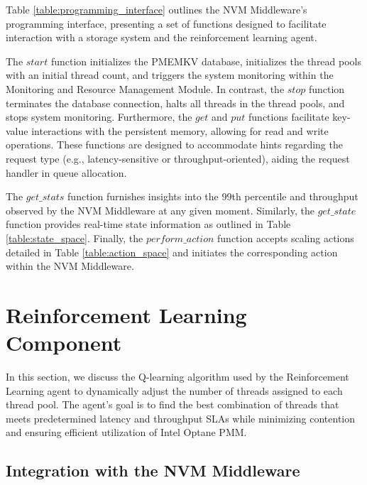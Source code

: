 Table \ref{table:programming_interface} outlines the NVM Middleware's programming interface, presenting a set of functions designed to facilitate interaction with a storage system and the reinforcement learning agent. 

The $start$ function initializes the PMEMKV database, initializes the thread pools with an initial thread count, and triggers the system monitoring within the Monitoring and Resource Management Module. In contrast, the $stop$ function terminates the database connection, halts all threads in the thread pools, and stops system monitoring. Furthermore, the $get$ and $put$ functions facilitate key-value interactions with the persistent memory, allowing for read and write operations. These functions are designed to accommodate hints regarding the request type (e.g., latency-sensitive or throughput-oriented), aiding the request handler in queue allocation.

The $get\_stats$ function furnishes insights into the 99th percentile and throughput observed by the NVM Middleware at any given moment. Similarly, the $get\_state$ function provides real-time state information as outlined in Table \ref{table:state_space}. Finally, the $perform\_action$ function accepts scaling actions detailed in Table \ref{table:action_space} and initiates the corresponding action within the NVM Middleware.

\section{Reinforcement Learning Component}

In this section, we discuss the Q-learning algorithm used by the Reinforcement Learning agent to dynamically adjust the number of threads assigned to each thread pool. The agent’s goal is to find the best combination of threads that meets predetermined latency and throughput SLAs while minimizing contention and ensuring efficient utilization of Intel Optane PMM. 

\subsection{Integration with the NVM Middleware}

